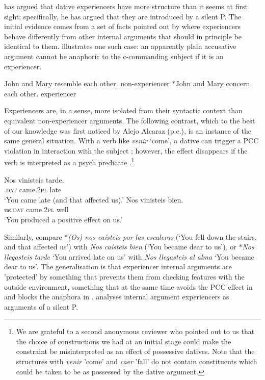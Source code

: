 \documentclass[output=paper,colorlinks,citecolor=brown,nonflat]{./langscibook}
\begin{document}
\citet{Landau2010} has argued that dative experiencers have more structure than it seems at first sight; specifically, he has argued that they are introduced by a silent P. The initial evidence comes from a set of facts pointed out by \citeauthor{Landau2010} where experiencers behave differently from other internal arguments that should in principle be identical to them.  illustrates one such case: an apparently plain accusative argument cannot be anaphoric to the c-commanding subject if it is an experiencer.  

\ea%
    \label{ex:fabregas:29}
    \ea\label{ex:fabregas:29a}
    John and Mary resemble each other. \hfill non-experiencer
    \ex\label{ex:fabregas:29b}
    *John and Mary concern each other. \hfill experiencer
    \z
\z

Experiencers are, in a sense, more isolated from their syntactic context than equivalent non-experiencer arguments. The following contrast, which to the best of our knowledge was first noticed by Alejo Alcaraz (p.c.), is an instance of the same general situation. With a verb like \textit{venir} `come', a dative can trigger a PCC violation in interaction with the subject ; however, the effect disappears if the verb is interpreted as a psych predicate .\footnote{We are grateful to a second anonymous reviewer who pointed out to us that the choice of constructions we had at an initial stage could make the constraint be misinterpreted as an effect of possessive datives. Note that the structures with \textit{venir} 'come' and \textit{caer} 'fall' do not contain constituents which could be taken to be as possessed by the dative argument.}

\ea%
    \label{ex:fabregas:30}
    \ea\label{ex:fabregas:30a}
    \gll    *Nos     vinisteis   tarde.\\
            \textsc{.dat}   {came.2}\textsc{pl}   {late}\\
    \glt    `You came late (and that affected us).'
    \ex\label{ex:fabregas:30b}
    \gll    Nos     vinisteis     bien.\\
            {us}\textsc{.dat}  {came.2}\textsc{pl}   {well}\\
    \glt `You produced a positive effect on us.'
    \z
\z

Similarly, compare *\textit{(Os) nos caísteis por las escaleras} (`You fell down the stairs, and that affected us') with \textit{Nos caísteis bien} (`You became dear to us'), or *\textit{Nos llegasteis tarde} `You arrived late on us' with \textit{Nos llegasteis al alma} `You became dear to us'. The generalisation is that experiencer internal arguments are 'protected' by something that prevents them from checking features with the outside environment, something that at the same time avoids the PCC effect in  and blocks the anaphora in . \citet{Landau2010} analyses internal argument experiencers as arguments of a silent P.
\end{document}
